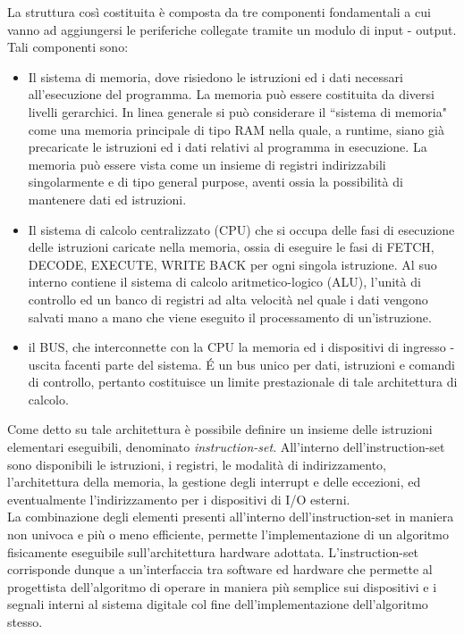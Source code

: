 \par %
\noindent
La struttura così costituita è composta da tre componenti fondamentali a cui vanno ad aggiungersi le periferiche collegate tramite un modulo di input - output. Tali componenti sono:
\begin{itemize}
	\item Il sistema di memoria, dove risiedono le istruzioni ed i dati necessari all'esecuzione del programma. La memoria può essere costituita da diversi livelli gerarchici. In linea generale si può considerare il \textquotedblleft sistema di memoria" come una memoria principale di tipo RAM nella quale, a runtime, siano già precaricate le istruzioni ed i dati relativi al programma in esecuzione. La memoria può essere vista come un insieme di registri indirizzabili singolarmente e di tipo general purpose, aventi ossia la possibilità di mantenere dati ed istruzioni.
	\item Il sistema di calcolo centralizzato (CPU) che si occupa delle fasi di esecuzione delle istruzioni caricate nella memoria, ossia di eseguire le fasi di FETCH, DECODE, EXECUTE, WRITE BACK per ogni singola istruzione. Al suo interno contiene il sistema di calcolo aritmetico-logico (ALU), l'unità di controllo ed un banco di registri ad alta velocità nel quale i dati vengono salvati mano a mano che viene eseguito il processamento di un'istruzione.
	\item il BUS, che interconnette con la CPU la memoria ed i dispositivi di ingresso - uscita facenti parte del sistema. \'E un bus unico per dati, istruzioni e comandi di controllo, pertanto costituisce un limite prestazionale di tale architettura di calcolo.
\end{itemize}
Come detto su tale architettura è possibile definire un insieme delle istruzioni elementari eseguibili, denominato \textit{instruction-set}. All'interno dell'instruction-set sono disponibili le istruzioni, i registri, le modalità di indirizzamento, l'architettura della memoria, la gestione degli interrupt e delle eccezioni, ed eventualmente l'indirizzamento per i dispositivi di I/O esterni.\\
La combinazione degli elementi presenti all'interno dell'instruction-set in maniera non univoca e più o meno efficiente, permette l'implementazione di un algoritmo fisicamente eseguibile sull'architettura hardware adottata.
L'instruction-set corrisponde dunque a un'interfaccia tra software ed hardware che permette al progettista dell'algoritmo di operare in maniera più semplice sui dispositivi e i segnali interni al sistema digitale col fine dell'implementazione dell'algoritmo stesso.\\
